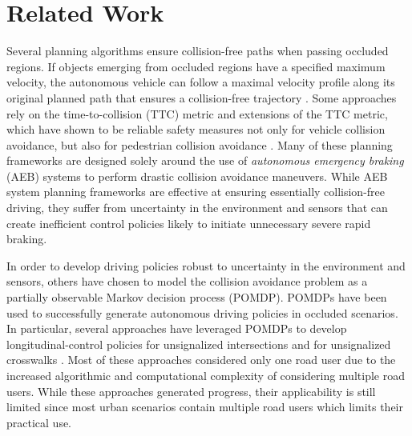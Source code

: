 \documentclass[conference]{IEEEtran}
\begin{document}
\section{Related Work}
\label{sec:related-work}

Several planning algorithms ensure collision-free paths when passing occluded regions. If objects emerging from occluded regions have a specified maximum velocity, the autonomous vehicle can follow a maximal velocity profile along its original planned path that ensures a collision-free trajectory \cite{Alami2002OnPlans}. Some approaches rely on the time-to-collision (TTC) metric and extensions of the TTC metric, which have shown to be reliable safety measures not only for vehicle collision avoidance, but also for pedestrian collision avoidance \cite{Minderhoud2001ExtendedAssessment, Volz2019InferringCrosswalks}. Many of these planning frameworks are designed solely around the use of \textit{autonomous emergency braking} (AEB) systems to perform drastic collision avoidance maneuvers. While AEB system planning frameworks are effective at ensuring essentially collision-free driving, they suffer from uncertainty in the environment and sensors that can create inefficient control policies likely to initiate unnecessary severe rapid braking.

In order to develop driving policies robust to uncertainty in the environment and sensors, others have chosen to model the collision avoidance problem as a partially observable Markov decision process (POMDP). POMDPs have been used to successfully generate autonomous driving policies in occluded scenarios. In particular, several approaches have leveraged POMDPs to develop longitudinal-control policies for unsignalized intersections \cite{Brechtel2014ProbabilisticPOMDPs, Hubmann2019AScenarios} and for unsignalized crosswalks \cite{Thornton2018ValuePlanning, Thornton2019TowardValues, Kapania2019ACrosswalks}. Most of these approaches considered only one road user due to the increased algorithmic and computational complexity of considering multiple road users. While these approaches generated progress, their applicability is still limited since most urban scenarios contain multiple road users which limits their practical use.
\end{document}
